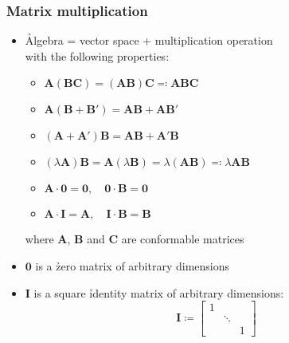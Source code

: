 \begin{frame}
  \frametitle{Matrix multiplication}

  \begin{itemize}
  \item \h{Algebra} = vector space + multiplication operation\\
    with the following properties:
    \begin{itemize}
    \item $\mathbf{A}(\mathbf{BC}) = (\mathbf{AB})\mathbf{C} \eqcolon \mathbf{ABC}$
    \item $\mathbf{A}(\mathbf{B} + \mathbf{B'}) = \mathbf{AB} + \mathbf{AB'}$
    \item $(\mathbf{A} + \mathbf{A'})\mathbf{B} = \mathbf{AB} + \mathbf{A'B}$
    \item $(\lambda \mathbf{A})\mathbf{B} = \mathbf{A}(\lambda \mathbf{B}) = \lambda (\mathbf{AB}) \eqcolon \lambda \mathbf{AB}$
    \item $\mathbf{A}\cdot \mathbf{0} = \mathbf{0}, \quad \mathbf{0}\cdot \mathbf{B} = \mathbf{0}$
    \item $\mathbf{A}\cdot \mathbf{I} = \mathbf{A}, \quad \mathbf{I}\cdot \mathbf{B} = \mathbf{B}$
    \end{itemize}
    where $\mathbf{A}$, $\mathbf{B}$ and $\mathbf{C}$ are conformable matrices%
  \item $\mathbf{0}$ is a \h{zero matrix} of arbitrary dimensions
  \item $\mathbf{I}$ is a square \h{identity matrix} of arbitrary dimensions:
    \[
    \mathbf{I} \coloneq
    \begin{bmatrix}
      1 & & \\
      & \ddots & \\
      & & 1
    \end{bmatrix}
    \]
  \end{itemize}
\end{frame}

